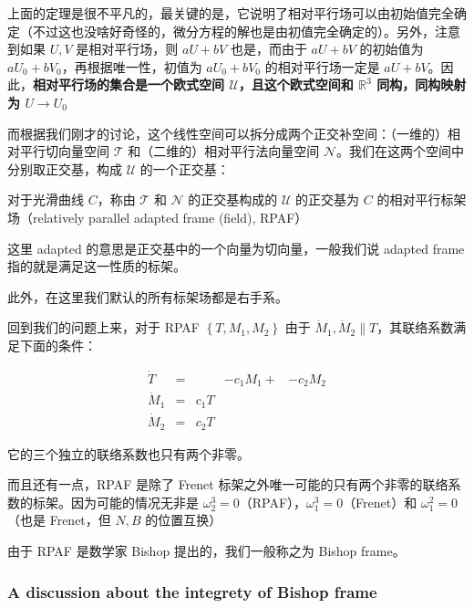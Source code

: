 \documentclass{notes}
\begin{document}
上面的定理是很不平凡的，最关键的是，它说明了相对平行场可以由初始值完全确定（不过这也没啥好奇怪的，微分方程的解也是由初值完全确定的）。另外，注意到如果 $U, V$ 是相对平行场，则 $aU + bV$ 也是，而由于 $aU + bV$ 的初始值为 $aU_0 + bV_0$，再根据唯一性，初值为 $aU_0 + bV_0$ 的相对平行场一定是 $aU + bV$。因此，\textbf{相对平行场的集合是一个欧式空间 $\mathcal{U}$，且这个欧式空间和 $\mathbb{R}^3$ 同构，同构映射为 $U \rightarrow U_0$}

而根据我们刚才的讨论，这个线性空间可以拆分成两个正交补空间：（一维的）相对平行切向量空间 $\mathcal{T}$ 和（二维的）相对平行法向量空间 $\mathcal{N}$。我们在这两个空间中分别取正交基，构成 $\mathcal{U}$ 的一个正交基：

\begin{definition}
	对于光滑曲线 $C$，称由 $\mathcal{T}$ 和 $\mathcal{N}$ 的正交基构成的 $\mathcal{U}$ 的正交基为 $C$ 的相对平行标架场（relatively parallel adapted frame (field), RPAF）
\end{definition}

\begin{remark}
	这里 adapted 的意思是正交基中的一个向量为切向量，一般我们说 adapted frame 指的就是满足这一性质的标架。

	此外，在这里我们默认的所有标架场都是右手系。
\end{remark}

回到我们的问题上来，对于 RPAF $\left\lbrace T, M_1, M_2 \right\rbrace$ 由于 $\dot{M}_1, \dot{M}_2 \parallel T$，其联络系数满足下面的条件：

\begin{equation}
	\begin{aligned}
		\dot{T} &= & &-c_1 M_1 + &-c_2 M_2 \\
		\dot{M}_1 &= &c_1 T \\
		\dot{M}_2 &= &c_2 T
	\end{aligned}
\end{equation}

它的三个独立的联络系数也只有两个非零。

而且还有一点，RPAF 是除了 Frenet 标架之外唯一可能的只有两个非零的联络系数的标架。因为可能的情况无非是 $\omega_2^3 = 0$（RPAF），$\omega_1^3 = 0$（Frenet）和 $\omega_1^2 = 0$（也是 Frenet，但 $N, B$ 的位置互换）

由于 RPAF 是数学家 Bishop 提出的，我们一般称之为 Bishop frame。

\subsubsection{A discussion about the integrety of Bishop frame}
\end{document}
